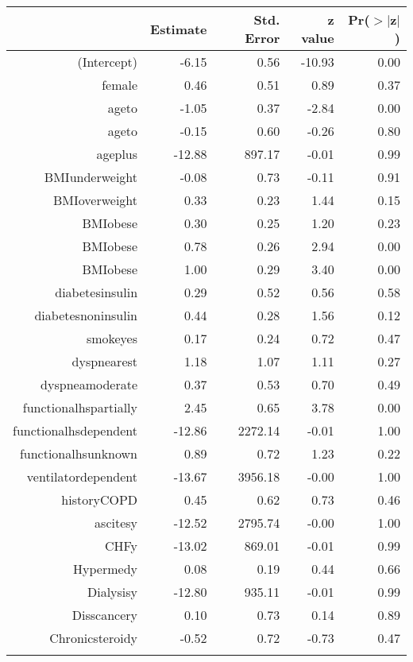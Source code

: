 \bigskip\bigskip
\centering
\begin{tabular}{rrrrr}
  \hline
 & Estimate & Std. Error & z value & Pr($>$$|$z$|$) \\ 
  \hline
(Intercept) & -6.15 & 0.56 & -10.93 & 0.00 \\ 
  female & 0.46 & 0.51 & 0.89 & 0.37 \\ 
  age\-65\-to\-74 & -1.05 & 0.37 & -2.84 & 0.00 \\ 
  age\-75\-to\-84 & -0.15 & 0.60 & -0.26 & 0.80 \\ 
  age\-85\-plus & -12.88 & 897.17 & -0.01 & 0.99 \\ 
  BMI\-underweight & -0.08 & 0.73 & -0.11 & 0.91 \\ 
  BMI\-overweight & 0.33 & 0.23 & 1.44 & 0.15 \\ 
  BMI\-obese\-1 & 0.30 & 0.25 & 1.20 & 0.23 \\ 
  BMI\-obese\-2 & 0.78 & 0.26 & 2.94 & 0.00 \\ 
  BMI\-obese\-3 & 1.00 & 0.29 & 3.40 & 0.00 \\ 
  diabetes\-insulin & 0.29 & 0.52 & 0.56 & 0.58 \\ 
  diabetes\-noninsulin & 0.44 & 0.28 & 1.56 & 0.12 \\ 
  smoke\-yes & 0.17 & 0.24 & 0.72 & 0.47 \\ 
  dyspnea\-rest & 1.18 & 1.07 & 1.11 & 0.27 \\ 
  dyspnea\-moderate & 0.37 & 0.53 & 0.70 & 0.49 \\ 
  functional\-hs\-partially & 2.45 & 0.65 & 3.78 & 0.00 \\ 
  functional\-hs\-dependent & -12.86 & 2272.14 & -0.01 & 1.00 \\ 
  functional\-hs\-unknown & 0.89 & 0.72 & 1.23 & 0.22 \\ 
  ventilator\-dependent & -13.67 & 3956.18 & -0.00 & 1.00 \\ 
  history\-COPD & 0.45 & 0.62 & 0.73 & 0.46 \\ 
  ascites\-y & -12.52 & 2795.74 & -0.00 & 1.00 \\ 
  CHF\-y & -13.02 & 869.01 & -0.01 & 0.99 \\ 
  Hyper\-med\-y & 0.08 & 0.19 & 0.44 & 0.66 \\ 
  Dialysis\-y & -12.80 & 935.11 & -0.01 & 0.99 \\ 
  Diss\-cancer\-y & 0.10 & 0.73 & 0.14 & 0.89 \\ 
  Chronic\-steroid\-y & -0.52 & 0.72 & -0.73 & 0.47 \\ 
$$
\end{tabular}

